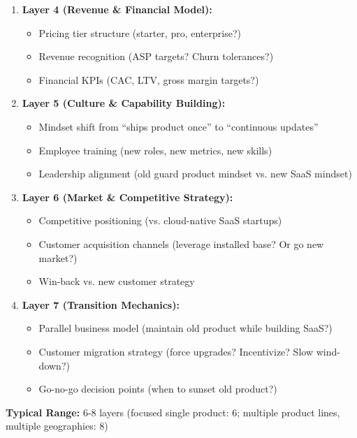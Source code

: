\documentclass[11pt, a4paper]{article}
\begin{document}
\begin{tcolorbox}[colback=gray!5!white, colframe=gray!75!black, title=Example: Business Model Transformation (e.g., Hardware to Software-as-a-Service)]
\begin{enumerate}
    \item \textbf{Layer 4 (Revenue \& Financial Model):}
    \begin{itemize}[nosep]
        \item Pricing tier structure (starter, pro, enterprise?)
        \item Revenue recognition (ASP targets? Churn tolerances?)
        \item Financial KPIs (CAC, LTV, gross margin targets?)
    \end{itemize}

    \item \textbf{Layer 5 (Culture \& Capability Building):}
    \begin{itemize}[nosep]
        \item Mindset shift from ``ships product once'' to ``continuous updates''
        \item Employee training (new roles, new metrics, new skills)
        \item Leadership alignment (old guard product mindset vs. new SaaS mindset)
    \end{itemize}

    \item \textbf{Layer 6 (Market \& Competitive Strategy):}
    \begin{itemize}[nosep]
        \item Competitive positioning (vs. cloud-native SaaS startups)
        \item Customer acquisition channels (leverage installed base? Or go new market?)
        \item Win-back vs. new customer strategy
    \end{itemize}

    \item \textbf{Layer 7 (Transition Mechanics):}
    \begin{itemize}[nosep]
        \item Parallel business model (maintain old product while building SaaS?)
        \item Customer migration strategy (force upgrades? Incentivize? Slow wind-down?)
        \item Go-no-go decision points (when to sunset old product?)
    \end{itemize}
\end{enumerate}

\textbf{Typical Range:} 6-8 layers (focused single product: 6; multiple product lines, multiple geographies: 8)

\end{tcolorbox}
\end{document}
